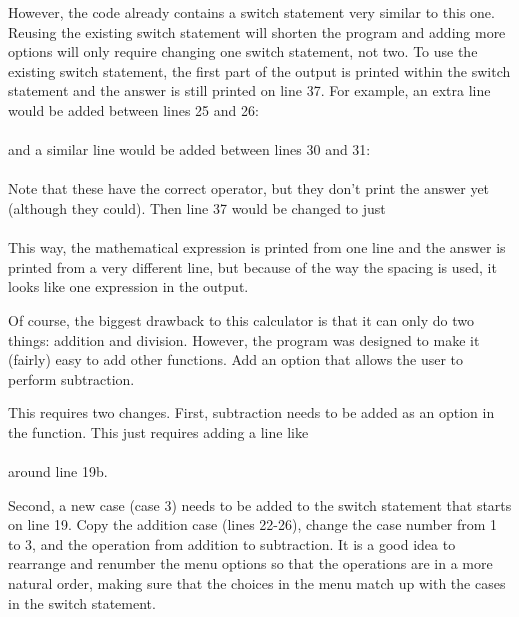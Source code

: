 However, the code already contains a switch statement very similar to this one.  Reusing the existing switch statement will shorten the program and adding more options will only require changing one switch statement, not two.  To use the existing switch statement, the first part of the output is printed within the switch statement and the answer is still printed on line 37.  For example, an extra line would be added between lines 25 and 26:\\
\\
and a similar line would be added between lines 30 and 31:\\
\\
Note that these have the correct operator, but they don't print the answer yet (although they could).  Then line 37 would be changed to just\\
\\
This way, the mathematical expression is printed from one line and the answer is printed from a very different line, but because of the way the spacing is used, it looks like one expression in the output.
         

Of course, the biggest drawback to this calculator is that it can only do two things: addition and division.  However, the program was designed to make it (fairly) easy to add other functions.  Add an option that allows the user to perform subtraction.  

This requires two changes.
First, subtraction needs to be added as an option in the  function.  This just requires adding a line like\\
\\
around line 19b.

Second, a new case (case 3) needs to be added to the switch statement that starts on line 19.  Copy the addition case (lines 22-26), change the case number from 1 to 3, and the operation from addition to subtraction.  It is a good idea to rearrange and renumber the menu options so that the operations are in a more natural order, making sure that the choices in the menu match up with the cases in the switch statement.


